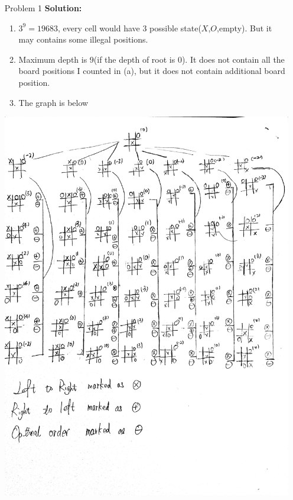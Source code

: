 \normalfont\documentclass[letterpaper,11pt]{article}
\begin{document}
\setlength{\parindent}{2ex}
\newcommand{\header}{
	\noindent {}
}
\bigskip
\header

\begin{enumerate}
\item[Problem 1]\textbf{Solution:}\par
	\begin{enumerate}
		\item $3^9 = 19683$, every cell would have 3 possible state($X$,$O$,empty). But it may contains some illegal positions.
		\item Maximum depth is 9(if the depth of root is $0$). It does not contain all the board positions I counted in (a), but it does not contain additional board position.
		\item The graph is below\par
	\end{enumerate}
	\includegraphics[width=0.69\linewidth]{1.jpg}
	

\end{enumerate}
\end{document}
